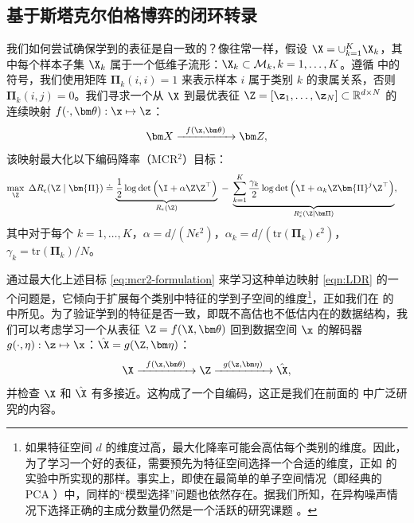 \documentclass[../../book-main_zh.tex]{subfiles}
\begin{document}
\subsection{基于斯塔克尔伯格博弈的闭环转录}\label{sec:closed-loop-transcription}

我们如何尝试确保学到的表征是自一致的？像往常一样，假设 $\X = \cup_{k=1}^K \X_k$，其中每个样本子集 $\X_k$ 属于一个低维子流形：$\X_k \subset \mathcal{M}_k, k = 1,\ldots, K$。遵循  中的符号，我们使用矩阵 $\bm \Pi_k(i,i) = 1$ 来表示样本 $i$ 属于类别 $k$ 的隶属关系，否则 $\bm \Pi_k(i,j) = 0$。我们寻求一个从 $\X$ 到最优表征 $\Z = [\z_1, \ldots, \z_N] \subset \mathbb{R}^{d \times N}$ 的连续映射 $f(\cdot,\bm \theta): \x \mapsto \z$：
\begin{equation}
    \bm X  \xrightarrow{\hspace{2mm} f(\x, \bm \theta) \hspace{2mm}} \bm Z,
    \label{eqn:LDR}
\end{equation}
该映射最大化以下编码降率（MCR$^2$）目标：
\begin{equation}\label{eq:mcr2-formulation}
    \begin{split}
        \max_{\Z} \; \Delta R_\epsilon(\Z  \mid \bm{\Pi}) %
        &\doteq \underbrace{\frac{1}{2}\log\det \Big(\I + {\alpha} \Z
        \Z^\top \Big)}_{R_{\epsilon}(\Z)} \;-\;
        \underbrace{\sum_{k=1}^{K}\frac{\gamma_k}{2} \log\det\Big(\I
                + {\alpha_k} \Z \bm{\Pi}^{j} \Z^\top
        \Big)}_{R^c_{\epsilon}(\Z \mid \bm \Pi)},
    \end{split}
\end{equation}
其中对于每个 $k = 1,\dots, K$，$\alpha = {d}/({N\epsilon^2})$，$\alpha_k =
d/({\mathrm{tr}(\bm{\Pi}_k)\epsilon^2})$，$\gamma_k =
{\mathrm{tr}(\bm{\Pi}_{k})}/{N}$。

通过最大化上述目标 \eqref{eq:mcr2-formulation} 来学习这种单边映射 \eqref{eqn:LDR} 的一个问题是，它倾向于扩展每个类别中特征的学到子空间的维度\footnote{如果特征空间 $d$ 的维度过高，最大化降率可能会高估每个类别的维度。因此，为了学习一个好的表征，需要预先为特征空间选择一个合适的维度，正如 \cite{yu2020learning} 的实验中所实现的那样。事实上，即使在最简单的单子空间情况（即经典的 PCA \cite{Jolliffe1986}）中，同样的“模型选择”问题也依然存在。据我们所知，在异构噪声情况下选择正确的主成分数量仍然是一个活跃的研究课题 \cite{hong2020selecting}。}，正如我们在  的  中所见。为了验证学到的特征是否一致，即既不高估也不低估内在的数据结构，我们可以考虑学习一个从表征 $\Z =
f(\X,\bm\theta)$ 回到数据空间 $\x$ 的解码器 $g(\cdot,\eta): \z \mapsto  \x$：$\hat \X = g(\Z, \bm\eta)$：
\begin{equation}
    \X \xrightarrow{\hspace{2mm} f(\x, \bm\theta)\hspace{2mm}} \Z
    \xrightarrow{\hspace{2mm} g(\z, \bm \eta) \hspace{2mm}} \hat \X,
    \label{eqn:autoencoding-ch6}
\end{equation}
并检查 $\X$ 和 $\hat \X$ 有多接近。这构成了一个自编码，这正是我们在前面的  中广泛研究的内容。
\end{document}
